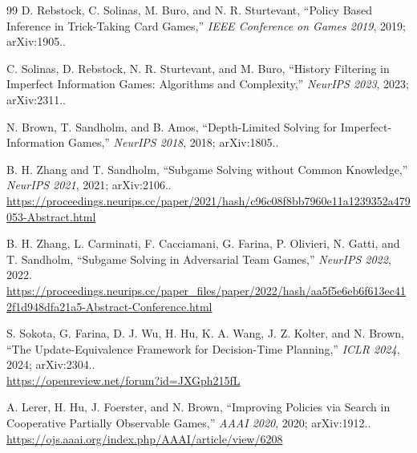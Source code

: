 \begin{thebibliography}{99}
D. Rebstock, C. Solinas, M. Buro, and N. R. Sturtevant, ``Policy Based Inference
in Trick-Taking Card Games,'' \emph{IEEE Conference on Games 2019}, 2019;
arXiv:1905..

C. Solinas, D. Rebstock, N. R. Sturtevant, and M. Buro, ``History Filtering in
Imperfect Information Games: Algorithms and Complexity,'' \emph{NeurIPS 2023},
2023; arXiv:2311..


N. Brown, T. Sandholm, and B. Amos, ``Depth-Limited Solving for
Imperfect-Information Games,'' \emph{NeurIPS 2018}, 2018; arXiv:1805..

B. H. Zhang and T. Sandholm, ``Subgame Solving without Common Knowledge,''
\emph{NeurIPS 2021}, 2021; arXiv:2106..\\
\url{https://proceedings.neurips.cc/paper/2021/hash/c96c08f8bb7960e11a1239352a479053-Abstract.html}

B. H. Zhang, L. Carminati, F. Cacciamani, G. Farina, P. Olivieri, N. Gatti, and
T. Sandholm, ``Subgame Solving in Adversarial Team Games,'' \emph{NeurIPS 2022},
2022.\\
\url{https://proceedings.neurips.cc/paper_files/paper/2022/hash/aa5f5e6eb6f613ec412f1d948dfa21a5-Abstract-Conference.html}

S. Sokota, G. Farina, D. J. Wu, H. Hu, K. A. Wang, J. Z. Kolter, and N. Brown,
``The Update-Equivalence Framework for Decision-Time Planning,'' \emph{ICLR
2024}, 2024; arXiv:2304..\\
\url{https://openreview.net/forum?id=JXGph215fL}

A. Lerer, H. Hu, J. Foerster, and N. Brown, ``Improving Policies via Search in
Cooperative Partially Observable Games,'' \emph{AAAI 2020}, 2020;
arXiv:1912..\\
\url{https://ojs.aaai.org/index.php/AAAI/article/view/6208}


\end{thebibliography}
